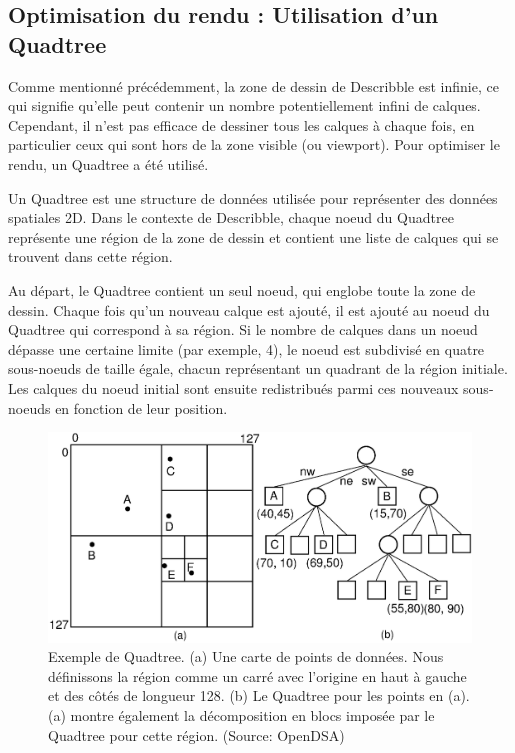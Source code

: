\subsection{Optimisation du rendu : Utilisation d'un Quadtree}

Comme mentionné précédemment, la zone de dessin de \Gls{Describble} est infinie, ce qui signifie qu'elle peut contenir un nombre potentiellement infini de calques. Cependant, il n'est pas efficace de dessiner tous les calques à chaque fois, en particulier ceux qui sont hors de la zone visible (ou \guillemotleft viewport\guillemotright). Pour optimiser le rendu, un Quadtree a été utilisé.

Un Quadtree est une structure de données utilisée pour représenter des données spatiales 2D. Dans le contexte de \Gls{Describble}, chaque noeud du Quadtree représente une région de la zone de dessin et contient une liste de calques qui se trouvent dans cette région.

Au départ, le Quadtree contient un seul noeud, qui englobe toute la zone de dessin. Chaque fois qu'un nouveau calque est ajouté, il est ajouté au noeud du Quadtree qui correspond à sa région. Si le nombre de calques dans un noeud dépasse une certaine limite (par exemple, 4), le noeud est subdivisé en quatre sous-noeuds de taille égale, chacun représentant un quadrant de la région initiale. Les calques du noeud initial sont ensuite redistribués parmi ces nouveaux sous-noeuds en fonction de leur position.

\begin{figure}[H]
    \centering
    \includegraphics[width=\textwidth]{assets/figures/quadtree.png}
    \caption{Exemple de Quadtree. (a) Une carte de points de données. Nous définissons la région comme un carré avec l'origine en haut à gauche et des côtés de longueur 128. (b) Le Quadtree pour les points en (a). (a) montre également la décomposition en blocs imposée par le Quadtree pour cette région. (Source: OpenDSA\cite{opendsaprojectPRQuadtreeData})}
    \label{fig:quadtree}
\end{figure}

